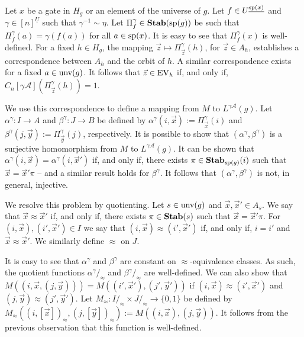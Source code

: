 \documentclass[a4paper,UKenglish]{lipics-v2018}
\begin{document}
Let $x$ be a gate in $H_g$ or an element of the universe of $g$. Let $f \in
U^{\underline{\text{sp}(x)}}$ and $\gamma \in [n]^{\underline{U}}$ such that
$\gamma^{-1} \sim \eta$. Let $\Pi^{\gamma}_{f} \in \text{\textbf{Stab}} (\text{sp} (g))$ be such that
$\Pi^{\gamma}_f (a) = \gamma (f(a))$ for all $a \in \text{sp}(x)$. It is easy to
see that $\Pi^{\gamma}_f(x)$ is well-defined. For a fixed $h \in H_g$, the
mapping $\vec{z} \mapsto \Pi^{\gamma}_{\vec{z}}(h)$, for $\vec{z} \in A_h$,
establishes a correspondence between $A_h$ and the orbit of $h$. A similar
correspondence exists for a fixed $a \in \text{unv}(g)$. It follows that $\vec{z}
\in \text{EV}_h$ if, and only if, $C_n[\gamma \mathcal{A}](\Pi^{\gamma}_{\vec{z}}(h))
= 1$. \cite{DW-arxiv}

We use this correspondence to define a mapping from $M$ to $L^{\gamma
  \mathcal{A}}(g)$. Let $\alpha^{\gamma}: I \rightarrow A$ and $\beta^{\gamma}:
J \rightarrow B$ be defined by $\alpha^{\gamma} (i, \vec{x}) :=
\Pi^{\gamma}_{\vec{x}}(i)$ and $\beta^{\gamma} (j, \vec{y}) :=
\Pi^{\gamma}_{\vec{y}}(j)$, respectively. It is possible to show that
$(\alpha^{\gamma}, \beta^{\gamma})$ is a surjective homomorphism from $M$ to
$L^{\gamma\mathcal{A}}(g)$. It can be shown that $\alpha^{\gamma}(i, \vec{x}) =
\alpha^{\gamma}(i, \vec{x}')$ if, and only if, there exists $\pi \in
\text{\textbf{Stab}}_{\text{sp}(g)}(i)$ such that $\vec{x} = \vec{x}' \pi$ -- and a similar result
holds for $\beta^{\gamma}$. It follows that $(\alpha^{\gamma}, \beta^{\gamma})$
is not, in general, injective.

We resolve this problem by quotienting. Let $s \in \text{unv}(g)$ and $\vec{x},
\vec{x}' \in A_s$. We say that $\vec{x} \approx \vec{x}'$ if, and only if, there
exists $\pi \in \text{\textbf{Stab}}(s)$ such that $\vec{x} = \vec{x}' \pi$. For $(i, \vec{x}),
(i', \vec{x}') \in I$ we say that $(i, \vec{x}) \approx (i', \vec{x}')$ if, and
only if, $i = i'$ and $\vec{x} \approx \vec{x}'$. We similarly define $\approx$
on $J$.

It is easy to see that $\alpha^{\gamma}$ and $\beta^{\gamma}$ are constant on
$\approx$-equivalence classes. As such, the quotient functions $\alpha^\gamma
/_\approx$ and $\beta^{\gamma} /_\approx$ are well-defined. We can also show
that $M((i, \vec{x}, (j, \vec{y}))) = M((i',\vec{x}'), (j', \vec{y}'))$ if $(i,
\vec{x}) \approx (i', \vec{x}')$ and $(j, \vec{y}) \approx (j', \vec{y}')$. Let
$M_{\approx} : I /_{\approx} \times J /_\approx \rightarrow \{0,1\}$ be defined
by $M_\approx ((i, [\vec{x}])_\approx, (j, [\vec{y}])_\approx) := M((i,\vec{x}),
(j, \vec{y}))$. It follows from the previous observation that this function is
well-defined.
\end{document}
